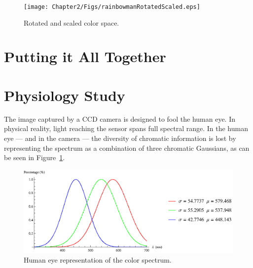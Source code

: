 \begin{figure}[h!]
  \caption{Rotated and scaled color space.}
  \centering
    \texttt{[image: Chapter2/Figs/rainbowmanRotatedScaled.eps]}
\end{figure}

\section{Putting it All Together}\label{sec:PuttingItAllTogether}

\section{Physiology Study}\label{sec:PhysiologyStudy}

The image captured by a CCD camera is designed to fool the human eye. In physical reality, light reaching the sensor spans full spectral range. In the human eye --- and in the camera --- the diversity of chromatic information is lost by representing the spectrum as a combination of three chromatic Gaussians, as can be seen in Figure~\ref{fig:spectrum}.

\begin{figure}[h!]
  \caption{Human eye representation of the color spectrum.}\label{fig:spectrum}
  \centering
    \includegraphics[width=\textwidth]{Chapter2/Figs/spectrum.eps}
\end{figure}

